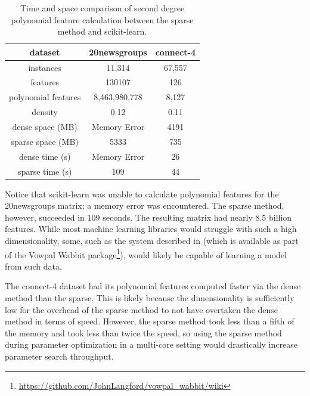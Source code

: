 \documentclass[11pt,twocolumn]{article}
\begin{document}
\begin{table}
    \centering
    \small    
    \begin{tabular}[numbered]{c | c | c} \label{table:results}
        dataset             & 20newsgroups  & connect-4 \\ \hline
        instances           & 11,314        & 67,557    \\ \hline
        features            & 130107       & 126       \\ \hline
        polynomial features & 8,463,980,778 & 8,127     \\ \hline
        density             & 0.12          & 0.11      \\ \hline
        dense space (MB)    & Memory Error  & 4191      \\ \hline
        sparse space (MB)   & 5333          & 735       \\ \hline
        dense time (s)      & Memory Error  & 26        \\ \hline
        sparse time (s)     & 109           & 44        \\ \hline
    \end{tabular}
    \caption{Time and space comparison of second degree polynomial feature calculation between the sparse method and scikit-learn.}
\end{table}

Notice that scikit-learn was unable to calculate polynomial features for the 20newsgroups 
matrix; a memory error was encountered. The sparse method, however, succeeded in 109 seconds.
The resulting matrix had nearly 8.5 billion features. While most machine learning libraries would
struggle with such a high dimensionality, some, such as the system described in \cite{agarwal2014reliable} (which is 
available as part of the Vowpal Wabbit package\footnote{\url{https://github.com/JohnLangford/vowpal_wabbit/wiki}}), would likely be capable
of learning a model from such data.

The connect-4 dataset had its polynomial features computed faster via the dense method than the sparse. This
is likely because the dimensionality is sufficiently low for the overhead of the sparse method
to not have overtaken the dense method in terms of speed. However, the sparse method took less than
a fifth of the memory and took less than twice the speed, so using the sparse method during parameter 
optimization in a multi-core setting would drastically increase parameter search throughput.
\end{document}
